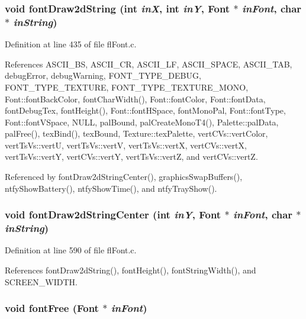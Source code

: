 \subsubsection{\setlength{\rightskip}{0pt plus 5cm}void font\-Draw2d\-String (int {\em in\-X}, int {\em in\-Y}, {\bf Font} $\ast$ {\em in\-Font}, char $\ast$ {\em in\-String})}\label{flFont_8c_0f17a042bd1e5d440c89e3da55e20898}




Definition at line 435 of file fl\-Font.c.

References ASCII\_\-BS, ASCII\_\-CR, ASCII\_\-LF, ASCII\_\-SPACE, ASCII\_\-TAB, debug\-Error, debug\-Warning, FONT\_\-TYPE\_\-DEBUG, FONT\_\-TYPE\_\-TEXTURE, FONT\_\-TYPE\_\-TEXTURE\_\-MONO, Font::font\-Back\-Color, font\-Char\-Width(), Font::font\-Color, Font::font\-Data, font\-Debug\-Tex, font\-Height(), Font::font\-HSpace, font\-Mono\-Pal, Font::font\-Type, Font::font\-VSpace, NULL, pal\-Bound, pal\-Create\-Mono\-T4(), Palette::pal\-Data, pal\-Free(), tex\-Bind(), tex\-Bound, Texture::tex\-Palette, vert\-CVs::vert\-Color, vert\-Ts\-Vs::vert\-U, vert\-Ts\-Vs::vert\-V, vert\-Ts\-Vs::vert\-X, vert\-CVs::vert\-X, vert\-Ts\-Vs::vert\-Y, vert\-CVs::vert\-Y, vert\-Ts\-Vs::vert\-Z, and vert\-CVs::vert\-Z.

Referenced by font\-Draw2d\-String\-Center(), graphics\-Swap\-Buffers(), ntfy\-Show\-Battery(), ntfy\-Show\-Time(), and ntfy\-Tray\-Show().
\subsubsection{\setlength{\rightskip}{0pt plus 5cm}void font\-Draw2d\-String\-Center (int {\em in\-Y}, {\bf Font} $\ast$ {\em in\-Font}, char $\ast$ {\em in\-String})}\label{flFont_8c_c90a718ef77455f561eafddf1fb8cc7b}




Definition at line 590 of file fl\-Font.c.

References font\-Draw2d\-String(), font\-Height(), font\-String\-Width(), and SCREEN\_\-WIDTH.
\subsubsection{\setlength{\rightskip}{0pt plus 5cm}void font\-Free ({\bf Font} $\ast$ {\em in\-Font})}\label{flFont_8c_9ba3d4e083b5da133a02be810608c100}




